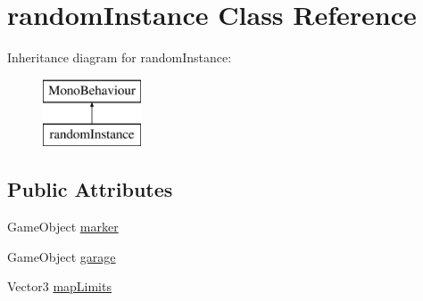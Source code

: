 \hypertarget{classrandom_instance}{}\section{random\+Instance Class Reference}
\label{classrandom_instance}
Inheritance diagram for random\+Instance\+:\begin{figure}[H]
\begin{center}
\leavevmode
\includegraphics[height=2.000000cm]{classrandom_instance}
\end{center}
\end{figure}
\subsection*{Public Attributes}
\begin{DoxyCompactItemize}
\item 
Game\+Object \hyperlink{classrandom_instance_ad4bc8c2a580c04743c7ffb1aef90eaa6}{marker}
\item 
Game\+Object \hyperlink{classrandom_instance_aa1cf4fffeff6817cf74a11edb50dab5f}{garage}
\item 
Vector3 \hyperlink{classrandom_instance_a33ee46bc94d972337d4b332f1473ed1b}{map\+Limits}
\end{DoxyCompactItemize}
